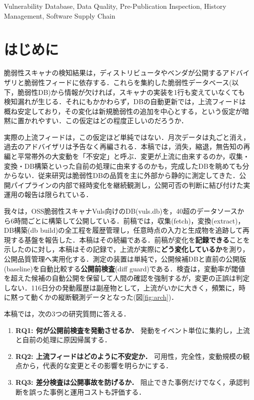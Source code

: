 \documentclass{css}
\begin{document}
\begin{ekeyword}
Vulnerability Database, Data Quality, Pre-Publication Inspection, History Management, Software Supply Chain
\end{ekeyword}

\maketitle

\section{はじめに}
\label{sec:intro}

脆弱性スキャナの検知結果は，ディストリビュータやベンダが公開するアドバイザリと脆弱性フィードに依存する．これらを集約した脆弱性データベース(以下，脆弱性DB)から情報が欠ければ，スキャナの実装を1行も変えていなくても検知漏れが生じる．それにもかかわらず，DBの自動更新では，上流フィードは概ね安定しており，その変化は新規脆弱性の追加を中心とする，という仮定が暗黙に置かれやすい．この仮定はどの程度正しいのだろうか．

実際の上流フィードは，この仮定ほど単純ではない．月次データは丸ごと消え，過去のアドバイザリは予告なく再編される．本稿では，消失，縮退，無告知の再編と平常帯外の大変動を「不安定」と呼ぶ．変更が上流に由来するのか，収集・変換・DB構築といった自前の処理に由来するのかも，完成したDBを眺めても分からない．従来研究は脆弱性DBの品質を主に外部から静的に測定してきた．公開パイプラインの内部で経時変化を継続観測し，公開可否の判断に結び付けた実運用の報告は限られている．

我々は，OSS脆弱性スキャナVuls\cite{vuls}向けのDB(vuls.db)を，40超のデータソースから6時間ごとに構築して公開している．前稿\cite{nakaoka2025}では，収集(fetch)，変換(extract)，DB構築(db build)の全工程を履歴管理し，任意時点の入力と生成物を追跡して再現する基盤を報告した．本稿はその続編である．前稿が変化を\textbf{記録できる}ことを示したのに対し，本稿はその記録で，上流が実際に\textbf{どう変化しているか}を測り，公開品質管理へ実用化する．測定の装置は単純で，公開候補DBと直前の公開版(baseline)を自動比較する\textbf{公開前検査}(diff guard)である．検査は，変動率が閾値を超えた候補の自動公開を保留して人間の確認を強制するが，変更の正誤は判定しない．116日分の発動履歴は副産物として，上流がいかに大きく，頻繁に，時に黙って動くかの縦断観測データとなった(図\ref{fig:arch})．

本稿では，次の3つの研究質問に答える．

\begin{enumerate}
\item \textbf{RQ1: 何が公開前検査を発動させるか．} 発動をイベント単位に集約し，上流と自前の処理に原因帰属する．
\item \textbf{RQ2: 上流フィードはどのように不安定か．} 可用性，完全性，変動規模の観点から，代表的な変更とその影響を明らかにする．
\item \textbf{RQ3: 差分検査は公開事故を防げるか．} 阻止できた事例だけでなく，承認判断を誤った事例と運用コストも評価する．
\end{enumerate}
\end{document}
